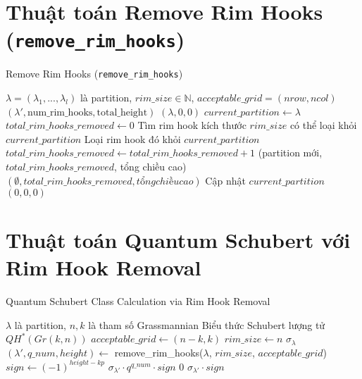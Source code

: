 \section*{Thuật toán Remove Rim Hooks (\texttt{remove\_rim\_hooks})}

\begin{algorithm}[H]
\caption{Remove Rim Hooks (\texttt{remove\_rim\_hooks})}
\begin{algorithmic}[1]
\REQUIRE $\lambda = (\lambda_1, ..., \lambda_l)$ là partition, $rim\_size \in \mathbb{N}$, $acceptable\_grid = (nrow, ncol)$
\ENSURE $(\lambda', \text{num\_rim\_hooks}, \text{total\_height})$
    \RETURN $(\lambda, 0, 0)$
\ENDIF
\STATE $current\_partition \gets \lambda$
\STATE $total\_rim\_hooks\_removed \gets 0$
    \STATE Tìm rim hook kích thước $rim\_size$ có thể loại khỏi $current\_partition$
        \STATE Loại rim hook đó khỏi $current\_partition$
        \STATE $total\_rim\_hooks\_removed \gets total\_rim\_hooks\_removed + 1$
            \RETURN (partition mới, $total\_rim\_hooks\_removed$, tổng chiều cao)
        \ENDIF
            \RETURN $(\emptyset, total\_rim\_hooks\_removed, tổng chiều cao)$
        \ENDIF
        \STATE Cập nhật $current\_partition$
    \ELSE
        \RETURN $(0, 0, 0)$
    \ENDIF
\ENDWHILE
\end{algorithmic}
\end{algorithm}

\section*{Thuật toán Quantum Schubert với Rim Hook Removal}

\begin{algorithm}[H]
\caption{Quantum Schubert Class Calculation via Rim Hook Removal}
\begin{algorithmic}[1]
\REQUIRE $\lambda$ là partition, $n, k$ là tham số Grassmannian
\ENSURE Biểu thức Schubert lượng tử $QH^*(Gr(k,n))$
\STATE $acceptable\_grid \gets (n-k, k)$
\STATE $rim\_size \gets n$
    \RETURN $\sigma_\lambda$
\ENDIF
\STATE $(\lambda', q\_num, height) \gets$ remove\_rim\_hooks($\lambda$, $rim\_size$, $acceptable\_grid$)
\STATE $sign \gets (-1)^{height-kp}$
    \RETURN $\sigma_{\lambda'} \cdot q^{q\_num} \cdot sign$
    \RETURN $0$
\ELSE
    \RETURN $\sigma_{\lambda'} \cdot sign$
\ENDIF
\end{algorithmic}
\end{algorithm}

